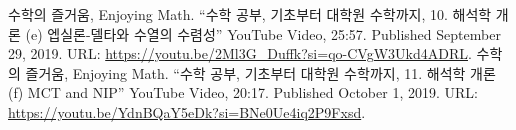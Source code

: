 \documentclass[11pt,openany]{article}
\begin{document}
\begin{thebibliography}{9}
	수학의 즐거움, Enjoying Math. ``수학 공부, 기초부터 대학원 수학까지, 10. 해석학 개론 (e) 엡실론-델타와 수열의 수렴성'' YouTube Video, 25:57. Published 
	September 29, 2019. URL: \url{https://youtu.be/2Ml3G_Duffk?si=qo-CVgW3Ukd4ADRL}.
	수학의 즐거움, Enjoying Math. ``수학 공부, 기초부터 대학원 수학까지, 11. 해석학 개론 (f) MCT and NIP'' YouTube Video, 20:17. Published 
	October 1, 2019. URL: \url{https://youtu.be/YdnBQaY5eDk?si=BNe0Ue4iq2P9Fxsd}.
\end{thebibliography}
\end{document}
